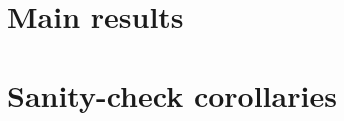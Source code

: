 \documentclass[11pt]{article}
\theoremstyle{definition}
\theoremstyle{plain}
\theoremstyle{remark}
\begin{document}
\section{Main results}

\section{Sanity-check corollaries}
\end{document}
